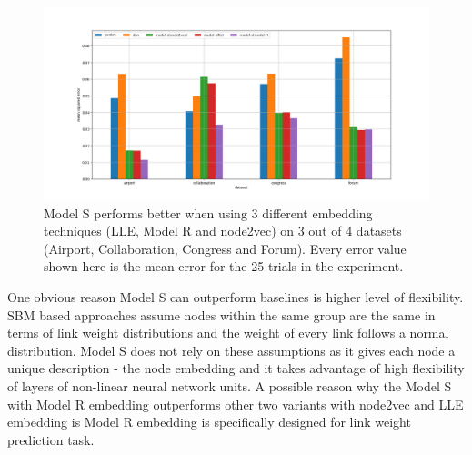 \documentclass[12pt]{WSUThesis}
\theoremstyle{definition}
\begin{document}
\begin{figure}[ht] \centering
	\includegraphics[width=1\linewidth]{weight-errors}
	\caption{
		Model S performs better when using 3 different embedding techniques (LLE, Model R and node2vec) on 3 out of 4 datasets (Airport, Collaboration, Congress and Forum).
		Every error value shown here is the mean error for the 25 trials in the experiment.
	}
	\label{fig:weight-errors}
\end{figure}
One obvious reason Model S can outperform baselines is higher level of flexibility.
SBM based approaches assume nodes within the same group are the same in terms of link weight distributions and the weight of every link follows a normal distribution.
Model S does not rely on these assumptions as it gives each node a unique description - the node embedding and it takes advantage of high flexibility of
layers of non-linear neural network units.
A possible reason why the Model S with Model R embedding outperforms other two variants with node2vec and LLE embedding is Model R embedding is specifically designed for link weight prediction task.
\end{document}

